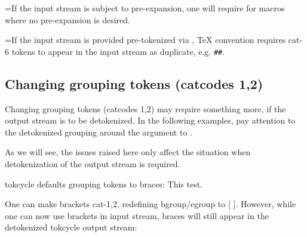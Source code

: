 \documentclass[10pt]{article}
\def\ddbend{\setbox0=\hbox{\dbend\dbend}\leavevmode\llap{%
  \raisebox{10pt}{\box0~}}}
\newcommand\TokCycle{\textsf{tokcycle}}
\begin{document}


\ddbend If the input stream is subject to pre-expansion, one
  will require  for macros where no pre-expansion
  is desired.\medskip

\ddbend If the input stream is provided pre-tokenized via 
  , \TeX{} convention requires cat-6 tokens to appear 
  in the input stream as duplicate, e.g. \texttt{\#\#}.


\subsection{Changing grouping tokens (catcodes 1,2)}

\begingroup

Changing grouping tokens (catcodes 1,2) may require something more,
  if the output stream is to be detokenized.  
In the following examples, pay attention to the
  detokenized grouping around the argument to .

\medskip
As we will see, the issues raised here only affect the situation
  when detokenization of the output stream is required.
\medskip

\begin{exampleA}[]{\TokCycle{} defaults grouping tokens to braces:}
\tokencycle
 {}
 {}
 {}
 {\addcytoks{ }}
This  test.
\endtokencycle\medskip

\detokenize\expandafter{\the\cytoks}
\end{exampleA}

One can make brackets cat-1,2, redefining bgroup/egroup to [ ].
However, while one can now use brackets in input stream, braces 
  will still appear in the detokenized \TokCycle{} output stream:
\end{document}
